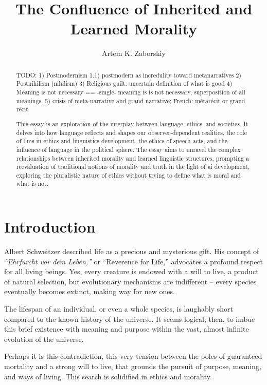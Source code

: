 \documentclass[11pt,a4]{article}
\begin{document}
\title{The Confluence of Inherited and Learned Morality}

\author{Artem K. Zaborskiy }


\maketitle




\begin{abstract}

TODO:
1) Postmodernism
1.1) postmodern as incredulity toward metanarratives
2) Postnihilism (nihilism)
3) Religious guilt: uncertain definition of what is good
4) Meaning is not necessary == -single- meaning is is not necessary, superposition of all meanings.
5) crisis of meta-narrative and grand narrative; French: métarécit or grand récit
\\
\par


This essay is an exploration of the interplay between language, ethics, and societies. It delves into how language reflects and shapes our observer-dependent realities, the role of \glspl{llm} in ethics and linguistics development, the ethics of speech acts, and the influence of language in the political sphere. The essay aims to unravel the complex relationships between inherited morality and learned linguistic structures, prompting a reevaluation of traditional notions of morality and truth in the light of \gls{ai} development, exploring the pluralistic nature of ethics without trying to define what is moral and what is not.
\end{abstract}

\tableofcontents
\printglossary[type=\acronymtype]





\section{Introduction}

    Albert Schweitzer described life as a precious and mysterious gift\cite{Schweitzer}. His concept of \textit{“Ehrfurcht vor dem Leben,”} or “Reverence for Life,” advocates a profound respect for all living beings. Yes, every creature is endowed with a will to live, a product of natural selection, but evolutionary mechanisms are indifferent – every species eventually becomes extinct, making way for new ones.
    \par
    The lifespan of an individual, or even a whole species, is laughably short compared to the known history of the universe. It seems logical, then, to imbue this brief existence with meaning and purpose within the vast, almost infinite evolution of the universe.
    \par
    Perhaps it is this contradiction, this very tension between the poles of guaranteed mortality and a strong will to live, that grounds the pursuit of purpose, meaning, and ways of living. This search is solidified in ethics and morality.
\end{document}
